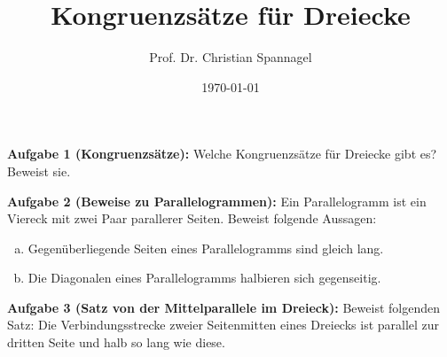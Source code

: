 \documentclass{../cssheet}
\title{Kongruenzsätze für Dreiecke}
\author{Prof. Dr. Christian Spannagel}
\date{\today}
\begin{document}
\printtitle

\textbf{Aufgabe 1 (Kongruenzsätze):}  Welche Kongruenzsätze für Dreiecke gibt es? Beweist sie.

\textbf{Aufgabe 2 (Beweise zu Parallelogrammen):}  Ein Parallelogramm ist ein Viereck mit zwei Paar parallerer Seiten. Beweist folgende Aussagen:
\begin{enumerate}[a)]
\item Gegenüberliegende Seiten eines Parallelogramms sind gleich lang.
\item Die Diagonalen eines Parallelogramms halbieren sich gegenseitig.
\end{enumerate}

\textbf{Aufgabe 3 (Satz von der Mittelparallele im Dreieck):}  Beweist folgenden Satz: Die Verbindungsstrecke zweier Seitenmitten eines Dreiecks ist parallel zur dritten Seite und halb so lang wie diese.

\vspace*{10mm}

\printlicense

\printsocials
\end{document}
